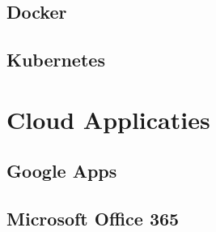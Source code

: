 \documentclass[a4paper,12pt,twoside,openright,titlepage]{book}
\begin{document}
\subsection{Docker}
\subsection{Kubernetes}
\section{Cloud Applicaties}
\subsection{Google Apps}
\subsection{Microsoft Office 365}

\printindex
\end{document}
